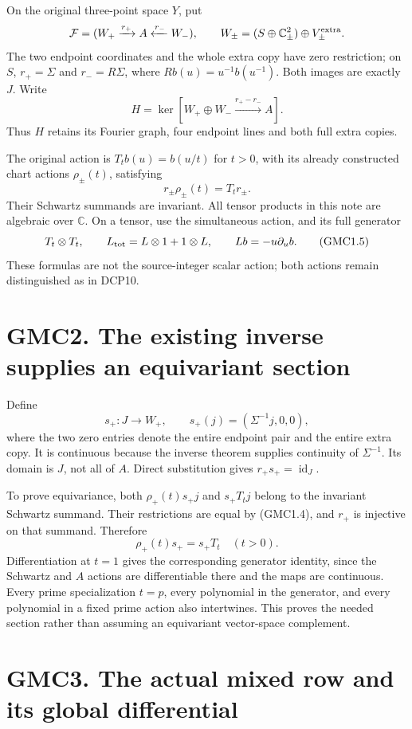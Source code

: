 On the original three-point space \(Y\), put \[
\mathcal F=(W_+\xrightarrow{r_+}A\xleftarrow{r_-}W_-),\qquad
W_\pm=(S\oplus\mathbb C^2_\pm)\oplus V_\pm^{\rm extra}.
\] The two endpoint coordinates and the whole extra copy have zero
restriction; on \(S\), \(r_+=\Sigma\) and \(r_-=R\Sigma\), where
\(Rb(u)=u^{-1}b(u^{-1})\). Both images are exactly \(J\). Write \[
H=\ker[W_+\oplus W_-\xrightarrow{r_+-r_-}A].
\tag{GMC1.3}
\] Thus \(H\) retains its Fourier graph, four endpoint lines and both
full extra copies.

The original action is \(T_t b(u)=b(u/t)\) for \(t>0\), with its already
constructed chart actions \(\rho_\pm(t)\), satisfying \[
r_\pm\rho_\pm(t)=T_t r_\pm.
\tag{GMC1.4}
\] Their Schwartz summands are invariant. All tensor products in this
note are algebraic over \(\mathbb C\). On a tensor, use the simultaneous
action, and its full generator \[
T_t\otimes T_t,\qquad L_{\rm tot}=L\otimes1+1\otimes L,
\qquad Lb=-u\partial_u b.
\tag{GMC1.5}
\] These formulas are not the source-integer scalar action; both actions
remain distinguished as in DCP10.

\section{GMC2. The existing inverse supplies an equivariant
section}\label{gmc2.-the-existing-inverse-supplies-an-equivariant-section}

Define \[
s_+:J\longrightarrow W_+,
\qquad s_+(j)=(\Sigma^{-1}j,0,0),
\tag{GMC2.1}
\] where the two zero entries denote the entire endpoint pair and the
entire extra copy. It is continuous because the inverse theorem supplies
continuity of \(\Sigma^{-1}\). Its domain is \(J\), not all of \(A\).
Direct substitution gives \(r_+s_+=\operatorname{id}_J\).

To prove equivariance, both \(\rho_+(t)s_+j\) and \(s_+T_tj\) belong to
the invariant Schwartz summand. Their restrictions are equal by
(GMC1.4), and \(r_+\) is injective on that summand. Therefore \[
\rho_+(t)s_+=s_+T_t\quad(t>0).
\tag{GMC2.2}
\] Differentiation at \(t=1\) gives the corresponding generator
identity, since the Schwartz and \(A\) actions are differentiable there
and the maps are continuous. Every prime specialization \(t=p\), every
polynomial in the generator, and every polynomial in a fixed prime
action also intertwines. This proves the needed section rather than
assuming an equivariant vector-space complement.

\section{GMC3. The actual mixed row and its global
differential}\label{gmc3.-the-actual-mixed-row-and-its-global-differential}

